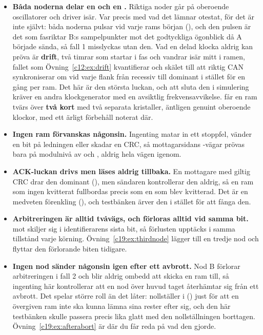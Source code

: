 \begin{itemize}
  \item \textbf{Båda noderna delar en  och en .} Riktiga noder går på
    oberoende oscillatorer och driver isär. Var precis med vad det lämnar otestat, för det är inte
     självt: båda noderna pulsar  vid varje rams början (),
    och den pulsen är det som fasriktar B:s sampelpunkter mot det godtyckliga ögonblick då A började
    sända, så fall 1 misslyckas utan den. Vad en delad klocka aldrig kan pröva är \textbf{drift}, två
    timrar som startar i fas och vandrar isär mitt i ramen, fallet som Övning~\ref{c12:ex:drift}
    kvantifierar och skälet till att riktig CAN synkroniserar om vid varje flank från recessiv till
    dominant i stället för en gång per ram. Det här är den största luckan, och att sluta den i
    simulering kräver en andra klockgenerator med en avsiktlig frekvensavvikelse.
     får en ram tvärs över \textbf{två kort} med två separata kristaller,
    äntligen genuint oberoende klockor, med ett ärligt förbehåll noterat där.
  \item \textbf{Ingen ram förvanskas någonsin.} Ingenting matar in ett stoppfel, vänder en bit på
    ledningen eller skadar en CRC, så mottagarsidans -vägar prövas bara på modulnivå av
     och , aldrig hela vägen igenom.
  \item \textbf{ACK-luckan drivs men läses aldrig tillbaka.} En mottagare med giltig CRC drar den
    dominant (), men sändaren kontrollerar den aldrig, så en ram som ingen kvitterat
    fullbordas precis som en som blev kvitterad. Det är en medveten förenkling
    (), och testbänken ärver den i stället för att fånga den.
  \item \textbf{Arbitreringen är alltid tvåvägs, och förloras alltid vid samma bit.}  mot
     skiljer sig i identifierarens sista bit, så förlusten upptäcks i samma tillstånd
    varje körning. Övning~\ref{c19:ex:thirdnode} lägger till en tredje nod och flyttar den förlorande
    biten tidigare.
  \item \textbf{Ingen nod sänder någonsin igen efter ett avbrott.} Nod B förlorar arbitreringen i
    fall 2 och blir aldrig ombedd att skicka en ram till, så ingenting här kontrollerar att en nod
    över huvud taget återhämtar sig från ett avbrott. Det spelar större roll än det låter:
     nollställer  i  () just för
    att en övergiven ram inte ska kunna lämna sina rester efter sig, och den här testbänken skulle
    passera precis lika glatt med den nollställningen borttagen. Övning~\ref{c19:ex:afterabort} är
    där du får reda på vad den gjorde.
\end{itemize}
